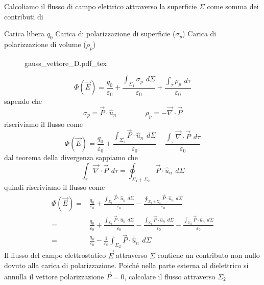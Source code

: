 \documentclass[x11names]{report}
\newcommand{\incfig}[1]{%
	{#1.pdf_tex}
}
\begin{document}
Calcoliamo il flusso di campo elettrico attraverso la superficie \(\Sigma\) come somma dei contributi di
\begin{center}
	 Carica libera \(q_0\) \hspace{0.2cm} Carica di polarizzazione di superficie (\(\sigma_p\)) \hspace{0.2cm} Carica di polarizzazione di volume (\(\rho_p\))
\end{center}

\begin{figure}[H]
	\centering
	\incfig{gauss_vettore_D}
\end{figure}	
\[
\Phi(\vec{E}) = \frac{q_0}{\varepsilon_0} + \frac{\int_{\Sigma_1} \sigma_p \,\ d\Sigma}{\varepsilon_0} + \frac{\int_\tau \rho_p \,\ d\tau}{\varepsilon_0}
\]
sapendo che 
\[
\sigma_p = \vec{P}\cdot\hat{u}_n \qquad \qquad \rho_p = - \vec{\nabla}\cdot\vec{P}
\]
riscriviamo il flusso come 
\[
\Phi(\vec{E}) = \frac{q_0}{\varepsilon_0} + \frac{\int_{\Sigma_1} \vec{P}\cdot\hat{u}_n \,\ d\Sigma}{\varepsilon_0} - \frac{\int_\tau  \vec{\nabla}\cdot\vec{P} \,\ d\tau}{\varepsilon_0}
\]
dal teorema della divergenza sappiamo che 
\[
\int_\tau  \vec{\nabla}\cdot\vec{P} \,\ d\tau = \oint_{\Sigma_1 + \Sigma_2} \vec{P}\cdot\hat{u}_n \,\ d\Sigma
\]
quindi riscriviamo il flusso come 
\begin{align*}
	\Phi(\vec{E}) =& \frac{q_0}{\varepsilon_0} + \frac{\int_{\Sigma_1} \vec{P}\cdot\hat{u}_n \,\ d\Sigma}{\varepsilon_0} - \frac{ \oint_{\Sigma_1 + \Sigma_2} \vec{P}\cdot\hat{u}_n \,\ d\Sigma}{\varepsilon_0} \\
				  =& \frac{q_0}{\varepsilon_0} + \frac{\int_{\Sigma_1} \vec{P}\cdot\hat{u}_n \,\ d\Sigma}{\varepsilon_0} - \frac{ \int_{\Sigma_1} \vec{P}\cdot\hat{u}_n \,\ d\Sigma}{\varepsilon_0} - \frac{ \int_{\Sigma_2} \vec{P}\cdot\hat{u}_n \,\ d\Sigma}{\varepsilon_0} \\
				  =& \frac{q_0}{\varepsilon_0} - \frac{1}{\varepsilon_0} \int_{\Sigma_2} \vec{P}\cdot\hat{u}_n \,\ d\Sigma
\end{align*}
Il flusso del campo elettrostatico \(\vec{E}\) attraverso \(\Sigma\) contiene un contributo non nullo dovuto alla carica di polarizzazione. Poiché nella parte esterna al dielettrico si annulla il vettore polarizzazione \(\vec{P} = 0\), calcolare il flusso attraverso \(\Sigma_2\)
\end{document}
